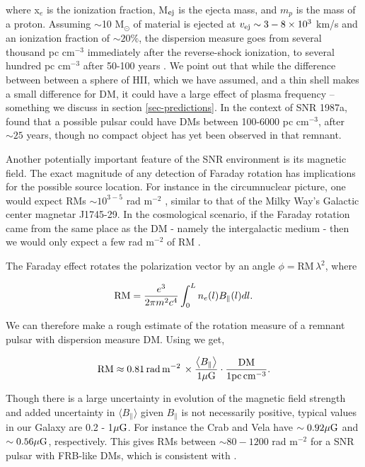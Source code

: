 \documentclass[useAMS,usenatbib]{mn2e}
\begin{document}
\noindent where x$_e$ is the ionization fraction, 
M$_{\rm ej}$ is the ejecta mass, and $m_p$ 
is the mass of a proton. Assuming $\sim$10 M$_{\odot}$ of material 
is ejected at $v_{\rm ej}\sim 3-8\times10^3$ km/s and an ionization fraction of 
$\sim20\% $, the dispersion measure goes from several 
thousand pc cm$^{-3}$ immediately
after the reverse-shock ionization, to several hundred pc cm$^{-3}$ after 50-100 years 
\cite{2014ApJ...796...82Z}. We point out that while the difference between between 
a sphere of HII, which we have assumed, and a thin shell makes a small difference
for DM, it could have a large effect of plasma frequency -- something we discuss
in section \ref{sec-predictions}.
In the context of SNR 1987a, \cite{2014ApJ...796...82Z} found that a possible pulsar 
could have DMs between 100-6000 pc cm$^{-3}$, after $\sim 25$ years, though 
no compact object has yet been observed in that remnant.

Another potentially important feature of the SNR environment is its magnetic
field. 
The exact magnitude of any detection of Faraday rotation has implications for the possible source location. For
instance in the circumnuclear picture, one would expect RMs 
$\sim10^{3-5}$ rad m$^{-2}$ \citep{2015arXiv150101341P}, similar to that of the Milky Way's
Galactic center magnetar J1745-29. In the cosmological scenario, if the Faraday 
rotation
came from the same place as the DM - namely the intergalactic medium -
then we would only expect a few rad m$^{-2}$ of RM \citep{2015A&A...575A.118O}. 

The Faraday effect rotates the polarization vector
by an angle $\phi = $RM$\, \lambda^2$, where

\begin{equation}
\textup{RM} = \frac{e^3}{2\pi m^2 c^4} \int_0^{L} n_e(l) B_\parallel (l) dl.
\end{equation}

We can therefore make a rough estimate of the rotation measure of a remnant 
pulsar with dispersion measure DM. Using 
\cite{2014ira..book.....B} we get,

\begin{equation}
\textup{RM} \approx 0.81\,\textup{rad}  \, \textup{m}^{-2} \, \times \frac{\left < B_{\parallel} \right >}
{1 \mu \rm G} \cdot \frac{\textup{DM}}{1 \textup{pc}\,\textup{cm}^{-3}} .
\end{equation}

Though there is a large uncertainty in evolution of the magnetic field strength and added
uncertainty in $\langle B_{\parallel} \rangle$ given $B_{\parallel}$ is not necessarily positive, 
typical values in our Galaxy are 0.2 - 1$\mu \rm G$. For instance the Crab and Vela have 
$ \sim 0.92 \mu \rm G$ and $\sim 0.56 \mu \rm G$, respectively. 
This gives RMs between $\sim 80-1200$
rad m$^{-2}$ for a SNR pulsar with FRB-like DMs, which is consistent with \citep{2015arXiv151200529M}.
\end{document}
